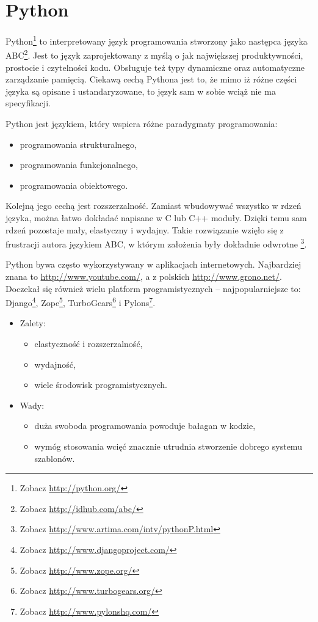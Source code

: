 \documentclass[a4paper,12pt,oneside]{report}
\begin{document}
\section{Python}
\label{sec:python}
Python\footnote{Zobacz \url{http://python.org/}} to interpretowany język programowania stworzony jako następca języka ABC\footnote{Zobacz \url{http://idhub.com/abc/}}. Jest to język zaprojektowany z myślą o jak największej produktywności, prostocie i czytelności kodu. Obsługuje też typy dynamiczne oraz automatyczne zarządzanie pamięcią. Ciekawą cechą Pythona jest to, że mimo iż różne części języka są opisane i ustandaryzowane, to język sam w sobie wciąż nie ma specyfikacji. 

Python jest językiem, który wspiera różne paradygmaty programowania:
\begin{itemize}
  \item programowania strukturalnego,
  \item programowania funkcjonalnego,
  \item programowania obiektowego.
\end{itemize}

Kolejną jego cechą jest rozszerzalność. Zamiast wbudowywać wszystko w rdzeń języka, można łatwo dokładać napisane w C lub C++ moduły. Dzięki temu sam rdzeń pozostaje mały, elastyczny i wydajny. Takie rozwiązanie wzięło się z frustracji autora językiem ABC, w którym założenia były dokładnie odwrotne \footnote{Zobacz \url{http://www.artima.com/intv/pythonP.html}}.

Python bywa często wykorzystywany w aplikacjach internetowych. Najbardziej znana to \url{http://www.youtube.com/}, a z polskich \url{http://www.grono.net/}. Doczekał się również wielu platform programistycznych -- najpopularniejsze to: Django\footnote{Zobacz \url{http://www.djangoproject.com/}}, Zope\footnote{Zobacz \url{http://www.zope.org/}}, TurboGears\footnote{Zobacz \url{http://www.turbogears.org/}} i Pylons\footnote{Zobacz \url{http://www.pylonshq.com/}}.

\begin{itemize}
  \item Zalety:
  \begin{itemize}
    \item elastyczność i rozszerzalność,
    \item wydajność,
    \item wiele środowisk programistycznych.
  \end{itemize}
  \item Wady:
  \begin{itemize}
    \item duża swoboda programowania powoduje bałagan w kodzie,
    \item wymóg stosowania wcięć znacznie utrudnia stworzenie dobrego systemu szablonów.
  \end{itemize}
\end{itemize}
\end{document}
